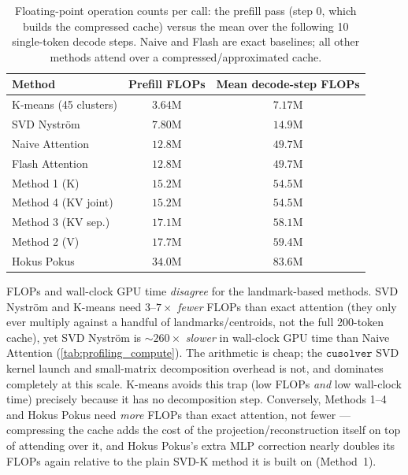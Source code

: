 \begin{table}[ht]
\centering
\caption{Floating-point operation counts per call: the prefill pass (step 0, which builds the
compressed cache) versus the mean over the following 10 single-token decode steps. Naive and
Flash are exact baselines; all other methods attend over a compressed/approximated cache.}
\label{tab:profiling_flops}
\begin{tabular}{l c c}
\toprule
Method & Prefill FLOPs & Mean decode-step FLOPs \\
\midrule
K-means (45 clusters) & $3.64$M  & $7.17$M  \\
SVD Nyström           & $7.80$M  & $14.9$M  \\
Naive Attention       & $12.8$M  & $49.7$M  \\
Flash Attention       & $12.8$M  & $49.7$M  \\
Method 1 (K)          & $15.2$M  & $54.5$M  \\
Method 4 (KV joint)   & $15.2$M  & $54.5$M  \\
Method 3 (KV sep.)    & $17.1$M  & $58.1$M  \\
Method 2 (V)          & $17.7$M  & $59.4$M  \\
Hokus Pokus           & $34.0$M  & $83.6$M  \\
\bottomrule
\end{tabular}
\end{table}

\noindent FLOPs and wall-clock GPU time \emph{disagree} for the landmark-based methods.
SVD Nyström and K-means need $3$--$7\times$ \emph{fewer} FLOPs than exact attention (they only
ever multiply against a handful of landmarks/centroids, not the full 200-token cache), yet
SVD Nyström is $\sim\!260\times$ \emph{slower} in wall-clock GPU time than Naive Attention
(\autoref{tab:profiling_compute}). The arithmetic is cheap; the $\texttt{cusolver}$ SVD kernel
launch and small-matrix decomposition overhead is not, and dominates completely at this scale.
K-means avoids this trap (low FLOPs \emph{and} low wall-clock time) precisely because it has no
decomposition step. Conversely, Methods 1--4 and Hokus Pokus need \emph{more} FLOPs than exact
attention, not fewer --- compressing the cache adds the cost of the projection/reconstruction
itself on top of attending over it, and Hokus Pokus's extra MLP correction nearly doubles its
FLOPs again relative to the plain SVD-K method it is built on (Method~1).



